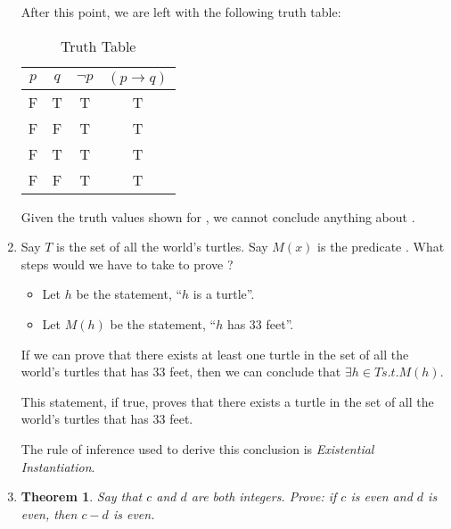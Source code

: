 \documentclass{article}
\newtheorem{theorem}{Theorem}
\begin{document}
\begin{enumerate}
          After this point, we are left with the following truth table:

          \begin{table}[h]
              \centering
              \begin{tabular}{|c|c||c|c|}
                  \hline
                  $p$ & $q$ & $\neg p$ & $(p \rightarrow q)$ \\ \hline
                  \hline
                  F   & T   & T        & T                   \\ \hline
                  F   & F   & T        & T                   \\ \hline
                  F   & T   & T        & T                   \\ \hline
                  F   & F   & T        & T                   \\ \hline
              \end{tabular}
              \caption{Truth Table}
          \end{table}

          Given the truth values shown for , we cannot conclude anything about .

          \newpage

    \item Say $T$ is the set of all the world's turtles. Say $M(x)$ is the predicate
          . What steps would we have to take to prove ?

          \begin{itemize}
              \item Let $h$ be the statement, ``$h$ is a turtle''.
              \item Let $M(h)$ be the statement, ``$h$ has $33$ feet''.
          \end{itemize}
          If we can prove that there exists at least one turtle in the set of all the world's turtles that has $33$ feet, then we can conclude that $\exists h \in T    s.t. M(h)$.
          
          This statement, if true, proves that there exists a turtle in the set of all the world's turtles that has $33$ feet.
          
          The rule of inference used to derive this conclusion is \textit{Existential Instantiation}.
          \newpage

    \item \begin{theorem}
              Say that $c$ and $d$ are both integers. Prove: if $c$ is even and $d$ is even,
              then $c-d$ is even.
          \end{theorem}


\end{enumerate}
\end{document}
